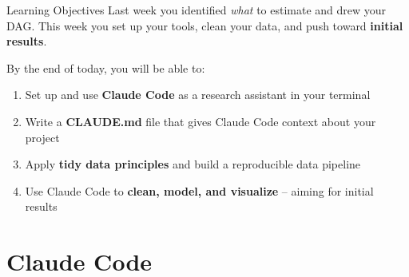 \begin{frame}{Learning Objectives}
  Last week you identified \textit{what} to estimate and drew your DAG. This week you set up your tools, clean your data, and push toward \textbf{initial results}.

  \vspace{6pt}

  By the end of today, you will be able to:

  \vspace{4pt}

  \begin{enumerate}
    \item Set up and use \textbf{Claude Code} as a research assistant in your terminal
    \item Write a \textbf{CLAUDE.md} file that gives Claude Code context about your project
    \item Apply \textbf{tidy data principles} and build a reproducible data pipeline
    \item Use Claude Code to \textbf{clean, model, and visualize} -- aiming for initial results
  \end{enumerate}
\end{frame}


\section{Claude Code}

